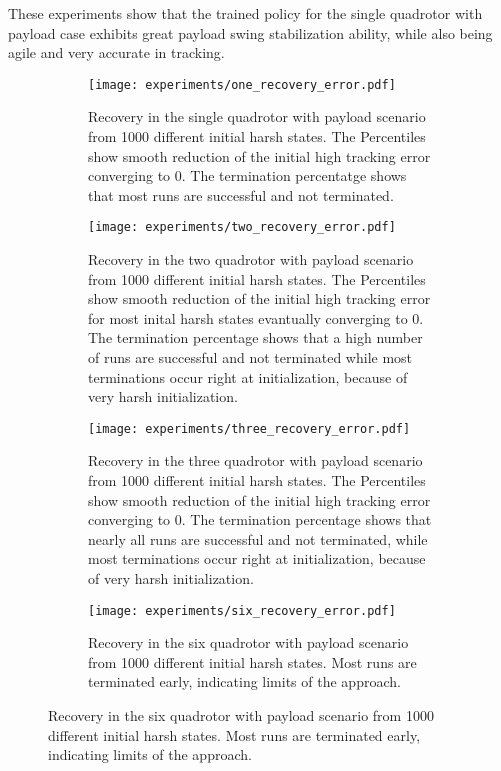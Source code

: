 These experiments show that the trained policy for the single quadrotor with payload case exhibits great payload swing stabilization ability, while also being agile and very accurate in tracking.
\begin{figure}[H]
  \centering
  \begin{subfigure}[t]{0.49\textwidth}
    \texttt{[image: experiments/one\_recovery\_error.pdf]}
    \caption[Single quadrotor recovery evaluation]{Recovery in the single quadrotor with payload scenario from 1000 different initial harsh states. The Percentiles show smooth reduction of the initial high tracking error converging to 0. The termination percentatge shows that most runs are successful and not terminated.}
    \label{fig:payload_error_over_time_single}
  \end{subfigure}\hfill
  \begin{subfigure}[t]{0.49\textwidth}
    \texttt{[image: experiments/two\_recovery\_error.pdf]}
    \caption[Two quadrotor recovery evaluation]{Recovery in the two quadrotor with payload scenario from 1000 different initial harsh states. The Percentiles show smooth reduction of the initial high tracking error for most inital harsh states evantually converging to 0. The termination percentage shows that a high number of runs are successful and not terminated while most terminations occur right at initialization, because of very harsh initialization.}
    \label{fig:payload_error_over_time_two}
  \end{subfigure}

  \vspace{1em}  %
  \begin{subfigure}[t]{0.49\textwidth}
    \texttt{[image: experiments/three\_recovery\_error.pdf]}
    \caption[Three quadrotor recovery evaluation]{Recovery in the three quadrotor with payload scenario from 1000 different initial harsh states. The Percentiles show smooth reduction of the initial high tracking error converging to 0. The termination percentage shows that nearly all runs are successful and not terminated, while most terminations occur right at initialization, because of very harsh initialization.}
    \label{fig:payload_error_over_time_three}
  \end{subfigure}\hfill
  \begin{subfigure}[t]{0.49\textwidth}
    \texttt{[image: experiments/six\_recovery\_error.pdf]}
    \caption[Six quadrotor recovery evaluation]{Recovery in the six quadrotor with payload scenario from 1000 different initial harsh states. Most runs are terminated early, indicating limits of the approach.}
    \label{fig:payload_error_over_time_six}
  \end{subfigure}


\end{figure}
